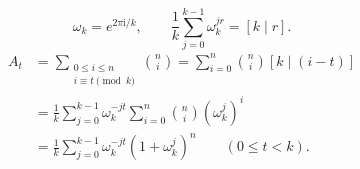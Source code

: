 \[
\omega_k=e^{2\pi\mathrm{i}/k},\qquad
\frac1k\sum_{j=0}^{k-1}\omega_k^{jr}=[k\mid r].
\]
\[
\begin{aligned}
A_t
&=\sum_{\substack{0\le i\le n\\i\equiv t\pmod k}}\binom ni
=\sum_{i=0}^n\binom ni[k\mid(i-t)]\\
&=\frac1k\sum_{j=0}^{k-1}\omega_k^{-jt}
	\sum_{i=0}^n\binom ni(\omega_k^j)^i\\
&=\boxed{\frac1k\sum_{j=0}^{k-1}
	\omega_k^{-jt}(1+\omega_k^j)^n}
\qquad(0\le t<k).
\end{aligned}
\]
